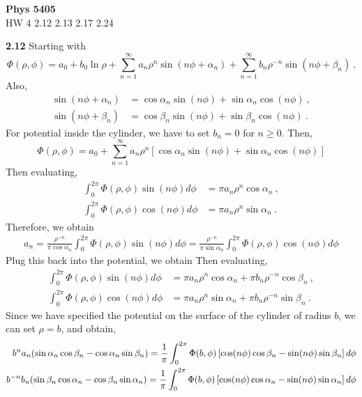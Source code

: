 \documentclass[12pt]{article}
\begin{document}
\begin{center}
{\bf Phys 5405}\\
HW 4 2.12 2.13 2.17 2.24
\end{center}
\textbf{2.12} Starting with
\begin{equation}
    \Phi(\rho, \phi) = a_0 + b_0 \ln \rho + \sum_{n=1}^\infty a_n \rho^n \sin(n \phi + \alpha_n) + \sum_{n=1}^\infty b_n \rho^{-n} \sin(n \phi + \beta_n)~.
\end{equation}
Also,
\begin{align}
    \sin(n\phi + \alpha_n) &= \cos\alpha_n \sin(n \phi) + \sin \alpha_n  \cos(n \phi) ~, \\
    \sin(n\phi + \beta_n) &= \cos\beta_n \sin(n \phi) + \sin \beta_n  \cos(n \phi)~.
\end{align}
For potential inside the cylinder, we have to set $b_n = 0$ for $n \ge 0$.
Then,
\begin{equation}
    \Phi(\rho, \phi) = a_0 + \sum_{n=1}^\infty a_n \rho^n\left[\cos\alpha_n \sin(n \phi) + \sin \alpha_n  \cos(n \phi)\right]
\end{equation}
Then evaluating,
\begin{align}
    \int_0^{2\pi} \Phi(\rho, \phi) \sin(n \phi) d\phi &= \pi a_n \rho^n \cos\alpha_n ~,\\
    \int_0^{2\pi} \Phi(\rho, \phi) \cos(n \phi) d\phi & = \pi a_n \rho^n \sin\alpha_n ~.
\end{align}
Therefore, we obtain
\begin{align}
    a_n = \frac{\rho^{-n}}{\pi \cos \alpha_n}  \int_0^{2\pi } \Phi(\rho, \phi) \sin(n \phi) d \phi = \frac{\rho^{-n}}{\pi \sin \alpha_n}  \int_0^{2\pi } \Phi(\rho, \phi) \cos(n \phi) d \phi
\end{align}
Plug this back into the potential, we obtain
Then evaluating,
\begin{align}
    \int_0^{2\pi} \Phi(\rho, \phi) \sin(n \phi) d\phi &= \pi a_n \rho^n \cos\alpha_n + \pi b_n \rho^{-n} \cos \beta_n~,\\
    \int_0^{2\pi} \Phi(\rho, \phi) \cos(n \phi) d\phi & = \pi a_n \rho^n \sin\alpha_n + \pi b_n \rho^{-n} \sin\beta_n~.
\end{align}
Since we have specified the potential on the surface of the cylinder of radius $b$, we can set $\rho = b$, and obtain,
\begin{align}
    b^n a_n (\sin \alpha_n \cos \beta_n - \cos \alpha_n \sin \beta_n) = \frac{1}{\pi} \int_{0} ^{2\pi} \Phi(b, \phi) \left[\cos(n\phi) \cos\beta_n-\sin(n \phi)\sin\beta_n\right] d\phi\cr
    b^{-n} b_n (\sin \beta_n \cos \alpha_n - \cos \beta_n \sin \alpha_n) = \frac{1}{\pi} \int_{0} ^{2\pi} \Phi(b, \phi) \left[\cos(n\phi) \cos\alpha_n-\sin(n \phi)\sin\alpha_n\right] d\phi \nonumber
\end{align}
\end{document}
